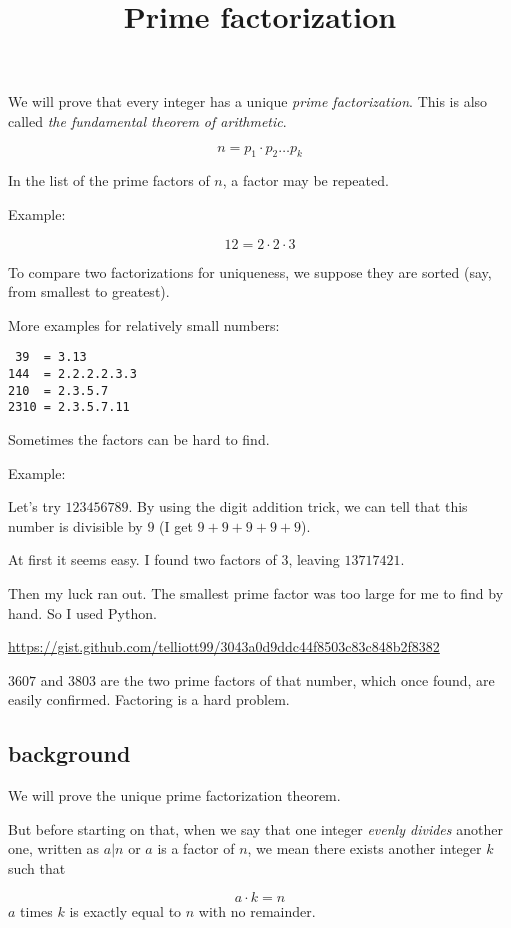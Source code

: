 \documentclass[11pt, oneside]{article}
\title{Prime factorization}
\date{}
\begin{document}
\maketitle
\large


We will prove that every integer has a unique \emph{prime factorization}.  This is also called \emph{the fundamental theorem of arithmetic}.

\[ n = p_1 \cdot p_2 \dots p_k \]

In the list of the prime factors of $n$, a factor may be repeated.

Example:

\[ 12 = 2 \cdot 2 \cdot 3 \]

To compare two factorizations for uniqueness, we suppose they are sorted (say, from smallest to greatest).

More examples for relatively small numbers:
\begin{verbatim}
 39  = 3.13
144  = 2.2.2.2.3.3
210  = 2.3.5.7
2310 = 2.3.5.7.11
\end{verbatim}

Sometimes the factors can be hard to find.

Example:

Let's try $123456789$.  By using the digit addition trick, we can tell that this number is divisible by $9$ (I get $9 + 9 + 9 + 9 + 9$).

At first it seems easy.  I found two factors of $3$, leaving $13717421$.

Then my luck ran out.  The smallest prime factor was too large for me to find by hand.  So I used Python.

\url{https://gist.github.com/telliott99/3043a0d9ddc44f8503c83c848b2f8382}

$3607$ and $3803$ are the two prime factors of that number, which once found, are easily confirmed.  Factoring is a hard problem.

\subsection*{background}

We will prove the unique prime factorization theorem.

But before starting on that, when we say that one integer \emph{evenly divides} another one, written as $a|n$ or $a$ is a factor of $n$, we mean there exists another integer $k$ such that

\[ a \cdot k = n \]
$a$ times $k$ is exactly equal to $n$ with no remainder.
\end{document}

